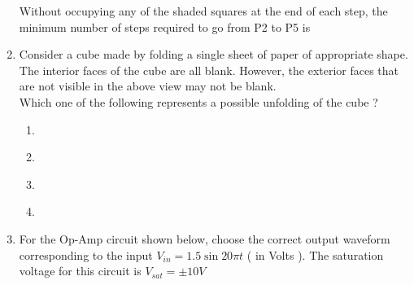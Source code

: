 \documentclass[journal]{IEEEtran}
\begin{document}
\begin{enumerate}
		Without occupying any of the shaded squares at the end of each step, the minimum number of steps required to go from P2 to P5 is
		\begin{enumerate}
		\end{enumerate}
	\item Consider a cube made by folding a single sheet of paper of appropriate shape. The interior faces of the cube are all blank. However, the exterior faces that are not visible in the above view may not be blank. \\
		Which one of the following represents a possible unfolding of the  cube ?
		\begin{multicols}{2}
			\begin{enumerate}
				\item
					\begin{figure}[H]
			\centering
			
			\label{tab: Q_10a}
		\end{figure}
				\item
					\begin{figure}[H]
			\centering
			
			\label{tab: Q_10b}
		\end{figure}
				\item
					\begin{figure}[H]
			\centering
			
			\label{tab: Q_10c}
		\end{figure}
				\item
					\begin{figure}[H]
			\centering
			
			\label{tab: Q_10d}
		\end{figure}
			\end{enumerate}
		\end{multicols}
	\item For the Op-Amp circuit shown below, choose the correct output waveform corresponding to the input $V_{in} = 1.5 \sin{20 \pi t}$ ( in Volts ). The saturation voltage for this circuit is $V_{sat} = \pm 10 V$
		\begin{figure}[H]
			\centering
			

\end{figure}
\end{enumerate}
\end{document}

